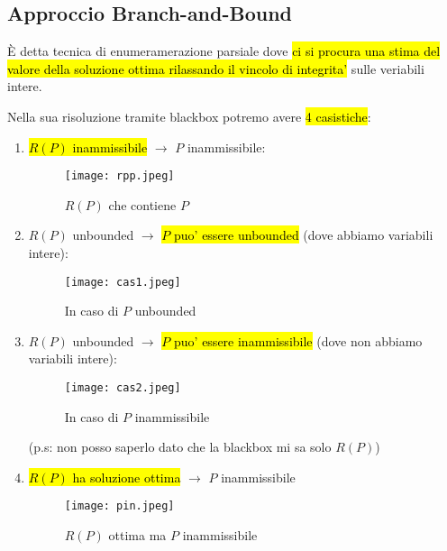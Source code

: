 \subsection{Approccio Branch-and-Bound}

È detta tecnica di enumeramerazione parsiale dove \hl{ci si procura una stima del valore della soluzione ottima rilassando il vincolo di integrita'} sulle veriabili intere.

Nella sua risoluzione tramite blackbox potremo avere \hl{4 casistiche}:

\begin{enumerate}
    \item \hl{$R(P)$ inammissibile} $\to$ $P$ inammissibile:
    
        \begin{figure}[H]
        \centering
        \texttt{[image: rpp.jpeg]}
        \caption{$R(P)$ che contiene $P$} 
        \label{rpp}
        \end{figure}
    
    \item $R(P)$ unbounded $\to$ \hl{$P$ puo' essere unbounded} (dove abbiamo variabili intere):
    
        \begin{figure}[H]
        \centering
        \texttt{[image: cas1.jpeg]}
        \caption{In caso di $P$ unbounded} 
        \label{cas1}
        \end{figure}
    
    \item $R(P)$ unbounded $\to$ \hl{$P$ puo' essere inammissibile} (dove non abbiamo variabili intere):
    
        \begin{figure}[H]
        \centering
        \texttt{[image: cas2.jpeg]}
        \caption{In caso di $P$ inammissibile} 
        \label{cas2}
        \end{figure}

        (p.s: non posso saperlo dato che la blackbox mi sa solo $R(P)$)

    \item \hl{$R(P)$ ha soluzione ottima} $\to$ $P$ inammissibile
        
        \begin{figure}[H]
        \centering
        \texttt{[image: pin.jpeg]}
        \caption{$R(P)$ ottima ma $P$ inammissibile} 
        \label{pin}
        \end{figure}


\end{enumerate}
